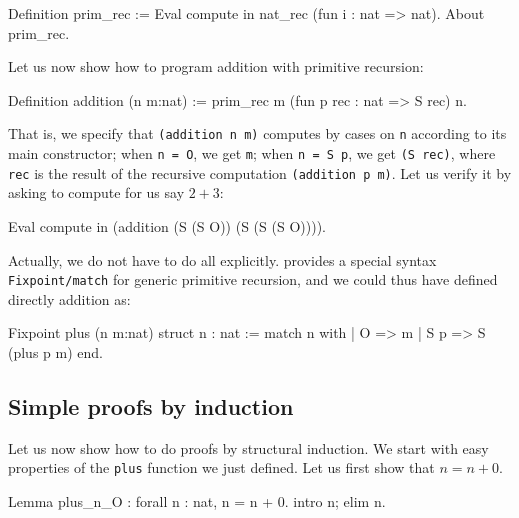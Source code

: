 \documentclass[11pt,a4paper]{book}
\begin{document}
\begin{coq_example}
Definition prim_rec :=
    Eval compute in nat_rec (fun i : nat => nat).
About prim_rec.
\end{coq_example}

Let us now show how to program addition with primitive recursion:
\begin{coq_example}
Definition addition (n m:nat) :=
    prim_rec m (fun p rec : nat => S rec) n.
\end{coq_example}

That is, we specify that \verb+(addition n m)+ computes by cases on \verb:n:
according to its main constructor; when \verb:n = O:, we get \verb:m:;
 when \verb:n = S p:, we get \verb:(S rec):, where \verb:rec: is the result
of the recursive computation \verb+(addition p m)+. Let us verify it by
asking \Coq{} to compute for us say $2+3$:
\begin{coq_example}
Eval compute in (addition (S (S O)) (S (S (S O)))).
\end{coq_example}

Actually, we do not have to do all explicitly. {\Coq} provides a
special syntax {\tt Fixpoint/match} for generic primitive recursion,
and we could thus have defined directly addition as:

\begin{coq_example}
Fixpoint plus (n m:nat) {struct n} : nat :=
  match n with
  | O => m
  | S p => S (plus p m)
  end.
\end{coq_example}

\end{document}
